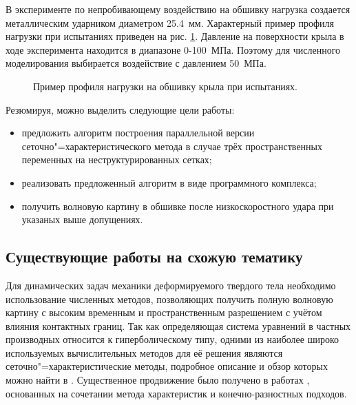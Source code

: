 В эксперименте по непробивающему воздействию на обшивку нагрузка создается 
металлическим ударником диаметром 25.4~мм. Характерный пример профиля нагрузки 
при испытаниях приведен на рис. \ref{pic:loadprofile}. Давление на поверхности 
крыла в ходе эксперимента находится в диапазоне 0-100~МПа. Поэтому для численного 
моделирования выбирается воздействие с давлением 50~МПа.
\begin{figure}[h]
\caption{Пример профиля нагрузки на обшивку крыла при испытаниях.}
\label{pic:loadprofile}
\end{figure}

Резюмируя, можно выделить следующие цели работы:
\begin{itemize}
\item предложить алгоритм построения параллельной версии сеточно"=характеристического метода в случае трёх пространственных переменных на неструктурированных сетках;
\item реализовать предложенный алгоритм в виде программного комплекса;
\item получить волновую картину в обшивке после низкоскоростного удара при
указаных выше допущениях.
\end{itemize}

\subsection*{Существующие работы на схожую тематику}

Для динамических задач механики деформируемого твердого тела необходимо
использование численных методов, позволяющих получить полную волновую картину с
высоким временным и пространственным разрешением с учётом влияния контактных
границ. Так как определяющая система уравнений в частных производных относится к
гиперболическому типу, одними из наиболее широко используемых вычислительных
методов для её решения являются сеточно"=характеристические методы, подробное описание и обзор которых можно найти в \cite{magomedov}. Существенное продвижение было получено в работах \cite{chushkin}, основанных на сочетании метода характеристик и конечно-разностных подходов.

